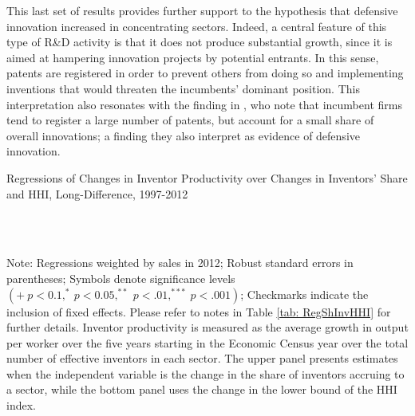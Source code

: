 This last set of results provides further support to the hypothesis
that defensive innovation increased in concentrating sectors. Indeed,
a central feature of this type of R\&D activity is that it does not
produce substantial growth, since it is aimed at hampering innovation
projects by potential entrants. In this sense, patents are registered
in order to prevent others from doing so and implementing inventions
that would threaten the incumbents' dominant position. This interpretation
also resonates with the finding in \citet{argentePatentsProductsProduct2020a},
who note that incumbent firms tend to register a large number of patents,
but account for a small share of overall innovations; a finding they
also interpret as evidence of defensive innovation.

\begin{table}[h]
\caption{Regressions of Changes in Inventor Productivity over Changes in Inventors'
Share and HHI, Long-Difference, 1997-2012\label{tab: RegProd}}

\begin{centering}
\\
\\
\par\end{centering}
\raggedright{}{\small{}Note: Regressions weighted by sales in 2012;
Robust standard errors in parentheses; Symbols denote significance
levels $\left(+\ p<0.1,^{*}\ p<0.05,^{**}\ p<.01,^{***}\ p<.001\right)$;
Checkmarks indicate the inclusion of fixed effects. Please refer to
notes in Table \ref{tab: RegShInvHHI} for further details. Inventor
productivity is measured as the average growth in output per worker
over the five years starting in the Economic Census year over the
total number of effective inventors in each sector. The upper panel
presents estimates when the independent variable is the change in
the share of inventors accruing to a sector, while the bottom panel
uses the change in the lower bound of the HHI index.}{\small\par}
\end{table}
\FloatBarrier
